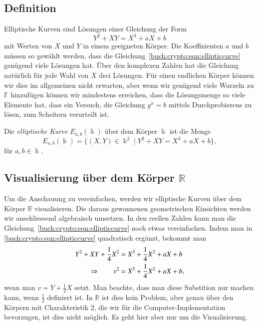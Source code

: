 \subsection{Definition}
Elliptische Kurven sind Lösungen einer Gleichung der Form
\begin{equation}
Y^2+XY=X^3+aX+b
\label{buch:crypto:eqn:ellipticcurve}
\end{equation}
mit Werten von $X$ und $Y$ in einem geeigneten Körper.
Die Koeffizienten $a$ und $b$ müssen so gewählt werden, dass die
Gleichung~\eqref{buch:crypto:eqn:ellipticcurve} genügend viele
Lösungen hat.
Über den komplexen Zahlen hat die Gleichung natürlich für jede Wahl von
$X$ drei Lösungen.
Für einen endlichen Körper können wir dies im allgemeinen nicht erwarten,
aber wenn wir genügend viele Wurzeln zu $\mathbb{F}$ hinzufügen können wir
mindestens erreichen, dass die Lösungsmenge so viele Elemente hat, 
dass ein Versuch, die Gleichung $g^x=b$ mittels Durchprobierens zu
lösen, zum Scheitern verurteilt ist.

\begin{definition}
\label{buch:crypto:def:ellipticcurve}
Die {\em elliptische Kurve} $E_{a,b}(\Bbbk)$ über dem Körper $\Bbbk$ ist 
%
die Menge
\[
E_{a,b}(\Bbbk)
=
\{(X,Y)\in\Bbbk^2 \mid Y^2+XY=X^3+aX+b\},
\]
für $a,b\in\Bbbk$.
\end{definition}

\subsection{Visualisierung über dem Körper $\mathbb{R}$}
Um die Anschauung zu vereinfachen, werden wir elliptische Kurven über
dem Körper $\mathbb{R}$ visualisieren.
Die daraus gewonnenen geometrischen Einsichten werden wir anschliessend
algebraisch umsetzen.
In den reellen Zahlen kann man die
Gleichung~\eqref{buch:crypto:eqn:ellipticcurve}
noch etwas vereinfachen.
Indem man in \eqref{buch:crypto:eqn:ellipticcurve} 
quadratisch ergänzt, bekommt man
\begin{align}
Y^2 + XY + \frac14X^2 &= X^3+\frac14 X^2 +aX+b
\notag
\\
\Rightarrow\qquad
v^2&=X^3+\frac14X^2+aX+b,
\label{buch:crypto:eqn:ell2}
\end{align}
wenn man $v=Y+\frac12X$ setzt.
Man beachte, dass man diese Substition nur machen kann, wenn $\frac12$
definiert ist.
In $\mathbb{R}$ ist dies kein Problem, aber genau über den Körpern
mit Charakteristik $2$, die wir für die Computer-Implementation
bevorzugen, ist dies nicht möglich.
Es geht hier aber nur um die Visualisierung.

